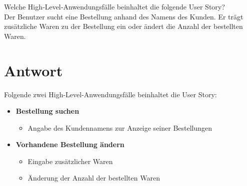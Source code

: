 Welche High‐Level‐Anwendungsfälle beinhaltet die folgende User Story?\\
Der Benutzer sucht eine Bestellung anhand des Namens des Kunden.
Er trägt zusätzliche Waren zu der Bestellung ein oder ändert die Anzahl der bestellten Waren.

\section*{Antwort}

Folgende zwei High-Level-Anwendungsfälle beinhaltet die User Story:

\begin{itemize}
    \item \textbf{Bestellung suchen}
        \begin{itemize}
            \item Angabe des Kundennamens zur Anzeige seiner Bestellungen
        \end{itemize}
\end{itemize}


\begin{itemize}
    \item \textbf{Vorhandene Bestellung ändern}
    \begin{itemize}
        \item Eingabe zusätzlicher Waren
        \item Änderung der Anzahl der bestellten Waren
    \end{itemize}
\end{itemize}